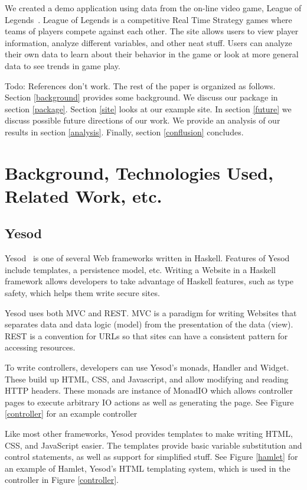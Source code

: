 \documentclass[letterpaper,twocolumn,9pt]{article}
\begin{document}
We created  a demo application using data from the on-line video game, League of Legends~\cite{lol}. League of Legends is a competitive Real Time Strategy games where teams of players compete against each other. The site allows users to view player information, analyze different variables, and other neat stuff. Users can analyze their own data to learn about their behavior in the game or look at more general data to see trends in game play. 

Todo: References don't work.
The rest of the paper is organized as follows. Section \ref{background} provides some background. We discuss our package in section \ref{package}. Section \ref{site} looks at our example site. In section \ref{future} we discuss possible future directions of our work. We provide an analysis of our results in section \ref{analysis}. Finally, section \ref{conflusion} concludes.

\section{Background, Technologies Used, Related Work, etc.}
\label{sec:background}

\subsection{Yesod}

Yesod~\cite{yesod} is one of several Web frameworks written in Haskell. Features of Yesod include templates, a persistence model, etc. Writing a Website in a Haskell framework allows developers to take advantage of Haskell features, such as type safety, which helps them write secure sites.

Yesod uses both MVC and REST. MVC is a paradigm for writing Websites that separates data and data logic (model) from the presentation of the data (view). REST is a convention for URLs so that sites can have a consistent pattern for accessing resources. 

To write controllers, developers can use Yesod's monads, Handler and Widget. These build up HTML, CSS, and Javascript, and allow modifying and reading HTTP headers. These monads are instance of MonadIO which allows controller pages to execute arbitrary IO actions as well as generating the page. See Figure \ref{controller} for an example controller 

Like most other frameworks, Yesod provides templates to make writing HTML, CSS, and JavaScript easier. The templates provide basic variable substitution and control statements, as well as support for simplified stuff. See Figure \ref{hamlet} for an example of Hamlet, Yesod's HTML templating system, which is used in the controller in Figure \ref{controller}.
\end{document}

